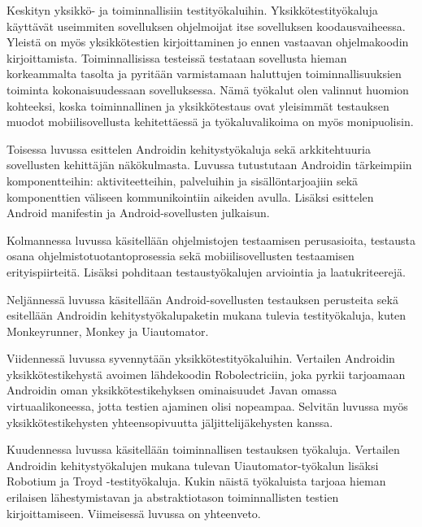 Keskityn yksikkö- ja toiminnallisiin testityökaluihin. Yksikkötestityökaluja käyttävät useimmiten sovelluksen ohjelmoijat itse sovelluksen koodausvaiheessa. Yleistä on myös yksikkötestien kirjoittaminen jo ennen vastaavan ohjelmakoodin kirjoittamista. Toiminnallisissa testeissä testataan sovellusta hieman korkeammalta tasolta ja pyritään varmistamaan haluttujen toiminnallisuuksien toiminta kokonaisuudessaan sovelluksessa. Nämä työkalut olen valinnut huomion kohteeksi, koska toiminnallinen ja yksikkötestaus ovat yleisimmät testauksen muodot mobiilisovellusta kehitettäessä ja työkaluvalikoima on myös monipuolisin.

Toisessa luvussa esittelen Androidin kehitystyökaluja sekä arkkitehtuuria sovellusten kehittäjän näkökulmasta. Luvussa tutustutaan Androidin tärkeimpiin komponentteihin: aktiviteetteihin, palveluihin ja sisällöntarjoajiin sekä komponenttien väliseen kommunikointiin aikeiden avulla. Lisäksi esittelen Android manifestin ja Android-sovellusten julkaisun.

Kolmannessa luvussa käsitellään ohjelmistojen testaamisen perusasioita, testausta osana ohjelmistotuotantoprosessia sekä mobiilisovellusten testaamisen erityispiirteitä. Lisäksi pohditaan testaustyökalujen arviointia ja laatukriteerejä. 

Neljännessä luvussa käsitellään Android-sovellusten testauksen perusteita sekä esitellään Androidin kehitystyökalupaketin mukana tulevia testityökaluja, kuten Monkeyrunner, Monkey ja Uiautomator.

Viidennessä luvussa syvennytään yksikkötestityökaluihin. Vertailen Androidin yksikkötestikehystä avoimen lähdekoodin Robolectriciin, joka pyrkii tarjoamaan Androidin oman yksikkötestikehyksen ominaisuudet Javan omassa virtuaalikoneessa, jotta testien ajaminen olisi nopeampaa. Selvitän luvussa myös yksikkötestikehysten yhteensopivuutta jäljittelijäkehysten kanssa.

Kuudennessa luvussa käsitellään toiminnallisen testauksen työkaluja. Vertailen Androidin kehitystyökalujen mukana tulevan Uiautomator-työkalun lisäksi Robotium ja Troyd -testityökaluja. Kukin näistä työkaluista tarjoaa hieman erilaisen lähestymistavan ja abstraktiotason toiminnallisten testien kirjoittamiseen. Viimeisessä luvussa on yhteenveto.